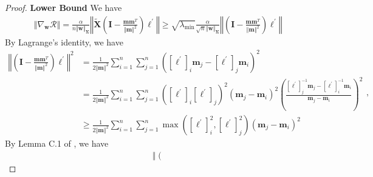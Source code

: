 \documentclass[pdflatex,sn-basic]{sn-jnl}%
\theoremstyle{thmstyleone}%
\begin{document}
\begin{appendices}
\begin{proof}
  \noindent\textbf{Lower Bound}
  We have 
  \begin{equation}\label{eq:gradient_norm_lower_start}
  \begin{aligned}
    \left\Vert 
      \nabla_{\mathbf{w}} \mathcal{R}
    \right\Vert
    =
    \frac{\alpha}{n \Vert \mathbf{w} \Vert_{\mathbf{\Sigma}}}
    \left\Vert
      \tilde{\mathbf{X}}
      \left(
        \mathbf{I} - \frac{\mathbf{m} \mathbf{m}^{T}}{\Vert \mathbf{m} \Vert^{2}}
      \right)
      \boldsymbol{\ell^\prime}
    \right\Vert
    \ge 
    \sqrt{\lambda_{\min}}
    \frac{\alpha}{\sqrt{n} \Vert \mathbf{w} \Vert_{\mathbf{\Sigma}}}
    \left\Vert
      \left(
        \mathbf{I} - \frac{\mathbf{m} \mathbf{m}^{T}}{\Vert \mathbf{m} \Vert^{2}}
      \right)
      \boldsymbol{\ell^\prime}
    \right\Vert
  \end{aligned}
  \end{equation}
  By Lagrange's identity, we have
  \begin{equation*}
  \begin{aligned}
    \left\Vert
      \left(
        \mathbf{I} - \frac{\mathbf{m} \mathbf{m}^{T}}{\Vert \mathbf{m} \Vert^{2}}
      \right)
      \boldsymbol{\ell^\prime}
    \right\Vert^2 
    & = 
    \frac{1}{2 \Vert \mathbf{m} \Vert^2}
    \sum_{i=1}^n \sum_{j=1}^{n}
    \left(
      [\boldsymbol{\ell^\prime}]_i
      \mathbf{m}_j
      -
      [\boldsymbol{\ell^\prime}]_j
      \mathbf{m}_i
    \right)^2 
    \\ & = 
    \frac{1}{2 \Vert \mathbf{m} \Vert^2}
    \sum_{i=1}^n \sum_{j=1}^{n}
    \left( [\boldsymbol{\ell^\prime}]_i [\boldsymbol{\ell^\prime}]_j \right)^2
    \left(
      \mathbf{m}_j - \mathbf{m}_i
    \right)^2
    \left(
      \frac{
        [\boldsymbol{\ell^\prime}]_j^{-1}
        \mathbf{m}_j
        -
        [\boldsymbol{\ell^\prime}]_i^{-1}
        \mathbf{m}_i
      }{
        \mathbf{m}_j - \mathbf{m}_i
      }
    \right)^2
    \\ & \ge 
    \frac{1}{2 \Vert \mathbf{m} \Vert^2}
    \sum_{i=1}^n \sum_{j=1}^{n}
    \max \left(
      [\boldsymbol{\ell^\prime}]_i^2, 
      [\boldsymbol{\ell^\prime}]_j^2
    \right)
    \left(
      \mathbf{m}_j - \mathbf{m}_i
    \right)^2
  \end{aligned},
  \end{equation*}
  By Lemma C.1 of \citep{implicit_bias_BN}, we have 
  \begin{equation}\label{eq:gradient_norm_lower_projection}
  \begin{aligned}
    \left\Vert
      \left(

\end{aligned}
\end{equation}
\end{proof}
\end{appendices}
\end{document}

